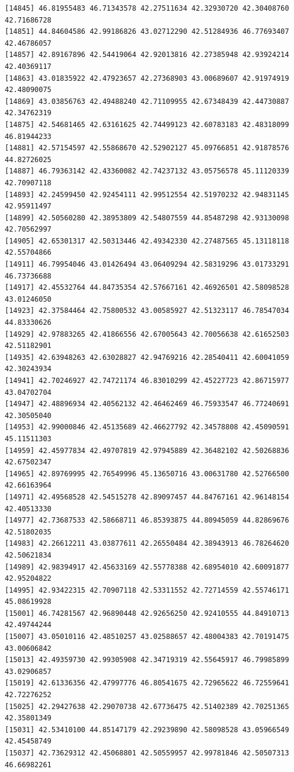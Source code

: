 \documentclass[
  letterpaper,
  DIV=11,
  numbers=noendperiod]{scrartcl}
\begin{document}
\begin{verbatim}
[14845] 46.81955483 46.71343578 42.27511634 42.32930720 42.30408760 42.71686728
[14851] 44.84604586 42.99186826 43.02712290 42.51284936 46.77693407 42.46786057
[14857] 42.89167896 42.54419064 42.92013816 42.27385948 42.93924214 42.40369117
[14863] 43.01835922 42.47923657 42.27368903 43.00689607 42.91974919 42.48090075
[14869] 43.03856763 42.49488240 42.71109955 42.67348439 42.44730887 42.34762319
[14875] 42.54681465 42.63161625 42.74499123 42.60783183 42.48318099 46.81944233
[14881] 42.57154597 42.55868670 42.52902127 45.09766851 42.91878576 44.82726025
[14887] 46.79363142 42.43360082 42.74237132 43.05756578 45.11120339 42.70907118
[14893] 42.24599450 42.92454111 42.99512554 42.51970232 42.94831145 42.95911497
[14899] 42.50560280 42.38953809 42.54807559 44.85487298 42.93130098 42.70562997
[14905] 42.65301317 42.50313446 42.49342330 42.27487565 45.13118118 42.55704866
[14911] 46.79954046 43.01426494 43.06409294 42.58319296 43.01733291 46.73736688
[14917] 42.45532764 44.84735354 42.57667161 42.46926501 42.58098528 43.01246050
[14923] 42.37584464 42.75800532 43.00585927 42.51323117 46.78547034 44.83330626
[14929] 42.97883265 42.41866556 42.67005643 42.70056638 42.61652503 42.51182901
[14935] 42.63948263 42.63028827 42.94769216 42.28540411 42.60041059 42.30243934
[14941] 42.70246927 42.74721174 46.83010299 42.45227723 42.86715977 43.04702704
[14947] 42.48896934 42.40562132 42.46462469 46.75933547 46.77240691 42.30505040
[14953] 42.99000846 42.45135689 42.46627792 42.34578808 42.45090591 45.11511303
[14959] 42.45977834 42.49707819 42.97945889 42.36482102 42.50268836 42.67502347
[14965] 42.89769995 42.76549996 45.13650716 43.00631780 42.52766500 42.66163964
[14971] 42.49568528 42.54515278 42.89097457 44.84767161 42.96148154 42.40513330
[14977] 42.73687533 42.58668711 46.85393875 44.80945059 44.82869676 42.51802035
[14983] 42.26612211 43.03877611 42.26550484 42.38943913 46.78264620 42.50621834
[14989] 42.98394917 42.45633169 42.55778388 42.68954010 42.60091877 42.95204822
[14995] 42.93422315 42.70907118 42.53311552 42.72714559 42.55746171 45.08619928
[15001] 46.74281567 42.96890448 42.92656250 42.92410555 44.84910713 42.49744244
[15007] 43.05010116 42.48510257 43.02588657 42.48004383 42.70191475 43.00606842
[15013] 42.49359730 42.99305908 42.34719319 42.55645917 46.79985899 43.02906857
[15019] 42.61336356 42.47997776 46.80541675 42.72965622 46.72559641 42.72276252
[15025] 42.29427638 42.29070738 42.67736475 42.51402389 42.70251365 42.35801349
[15031] 42.53410100 44.85147179 42.29239890 42.58098528 43.05966549 42.45458749
[15037] 42.73629312 42.45068801 42.50559957 42.99781846 42.50507313 46.66982261

\end{verbatim}
\end{document}
